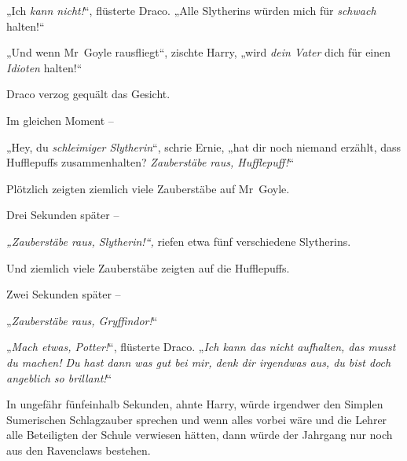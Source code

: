 „Ich \emph{kann nicht!}“, flüsterte Draco. „Alle Slytherins würden mich für \emph{schwach} halten!“

„Und wenn Mr~Goyle rausfliegt“, zischte Harry, „wird \emph{dein Vater} dich für einen \emph{Idioten} halten!“

Draco verzog gequält das Gesicht.

Im gleichen Moment –

„Hey, du \emph{schleimiger Slytherin}“, schrie Ernie, „hat dir noch niemand erzählt, dass Hufflepuffs zusammenhalten? \emph{Zauberstäbe raus, Hufflepuff!}“

Plötzlich zeigten ziemlich viele Zauberstäbe auf Mr~Goyle.

Drei Sekunden später –

\emph{„Zauberstäbe raus, Slytherin!“,} riefen etwa fünf verschiedene Slytherins.

Und ziemlich viele Zauberstäbe zeigten auf die Hufflepuffs.

Zwei Sekunden später –

„\emph{Zauberstäbe raus, Gryffindor!}“

„\emph{Mach etwas, Potter!}“, flüsterte Draco. „\emph{Ich kann das nicht aufhalten, das musst du machen! Du hast dann was gut bei mir, denk dir irgendwas aus, du bist doch angeblich so brillant!}“

In ungefähr fünfeinhalb Sekunden, ahnte Harry, würde irgendwer den Simplen Sumerischen Schlagzauber sprechen und wenn alles vorbei wäre und die Lehrer alle Beteiligten der Schule verwiesen hätten, dann würde der Jahrgang nur noch aus den Ravenclaws bestehen.

